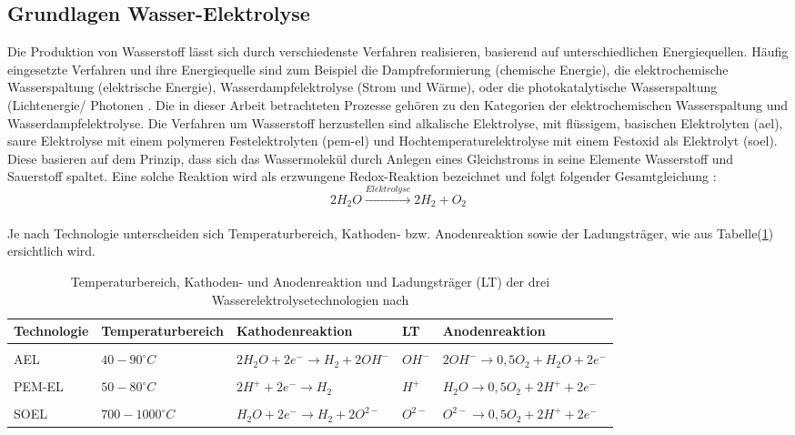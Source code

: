 \documentclass[onecolumn,10pt,titlepage]{article}
\begin{document}
\subsection{Grundlagen Wasser-Elektrolyse}
\label{subs_Grundl_EL}

Die Produktion von Wasserstoff lässt sich durch verschiedenste Verfahren realisieren, basierend auf unterschiedlichen Energiequellen. Häufig eingesetzte Verfahren und ihre Energiequelle sind zum Beispiel die Dampfreformierung (chemische Energie), die elektrochemische Wasserspaltung (elektrische Energie), Wasserdampfelektrolyse (Strom und Wärme), oder die photokatalytische Wasserspaltung (Lichtenergie/ Photonen \cite{Schnurnberge.2004}. Die in dieser Arbeit betrachteten Prozesse gehören zu den Kategorien der elektrochemischen Wasserspaltung und Wasserdampfelektrolyse. Die Verfahren um Wasserstoff herzustellen sind alkalische Elektrolyse, mit flüssigem, basischen Elektrolyten (\gls{ael}), saure Elektrolyse mit einem polymeren Festelektrolyten (\gls{pem}-\gls{el}) und Hochtemperaturelektrolyse mit einem Festoxid als Elektrolyt (\gls{soel}).\cite{Smolinka.05.07.2011} Diese basieren auf dem Prinzip, dass sich das Wassermolekül durch Anlegen eines Gleichstroms in seine Elemente Wasserstoff und Sauerstoff spaltet. Eine solche Reaktion wird als erzwungene Redox-Reaktion bezeichnet und folgt folgender Gesamtgleichung \cite{Ghaib.2017}:
\\
\begin{equation} 
2H_2O \xrightarrow{Elektrolyse} 2H_2+O_2
\label{eq:EL_REakt}
\end{equation}
\\
Je nach Technologie unterscheiden sich Temperaturbereich, Kathoden- bzw. Anodenreaktion sowie der Ladungsträger, wie aus Tabelle(\ref{tab:Tempber+Reakt}) ersichtlich wird.

\begin{table}[H]

	\label{tab:Tempber+Reakt}
	\caption{Temperaturbereich, Kathoden- und Anodenreaktion und Ladungsträger (LT) der drei Wasserelektrolysetechnologien nach \cite{Lindermeir.7.11.2017}}
	
	\begin{tabular*}{\textwidth}{lllll}
		
		\textbf{Technologie} & \textbf{Temperaturbereich} & \textbf{Kathodenreaktion} & \textbf{LT} & \textbf{Anodenreaktion} \\ \hline \hline
		&&&&\\
		AEL&$40-90 ^\circ{C} $&$ 2H_2O + 2e^- \rightarrow H_2 + 2OH^- $&$OH^-$&$2OH^- \rightarrow 0,5O_2 + H_2O + 2e^- $\\
		&&&&\\
		PEM-EL&$50-80 ^\circ{C} $&$ 2H^+ + 2e^- \rightarrow H_2$&$ H^+ $&$ H_2O \rightarrow 0,5O_2 + 2H^+ +2e^- $\\
		&&&&\\
		SOEL&$700-1000 ^\circ{C} $&$ H_2O + 2e^- \rightarrow H_2 + 2O^{2-}$&$ O^{2-} $&$ O^{2-} \rightarrow 0,5O_2 + 2H^+ + 2e^-$\\
		
	\end{tabular*}
	
\end{table}
\end{document}
